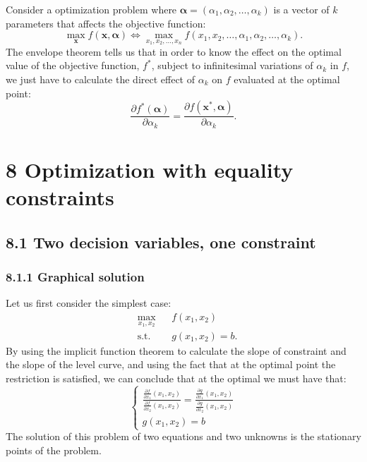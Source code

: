 \documentclass[0pt, a4paper]{article}
\begin{document}
Consider a optimization problem where $\boldsymbol{\alpha}=(\alpha_1,\alpha_2,\dots,\alpha_k)$ is a vector of $k$ parameters that affects the objective function:
$$\max_\textbf{x} f(\textbf{x},\boldsymbol{\alpha})\Leftrightarrow\max_{x_1,x_2,\dots,x_n}f(x_1,x_2,\dots,\alpha_1,\alpha_2,\dots,\alpha_k).$$
The envelope theorem tells us that in order to know the effect on the optimal value of the objective function, $f^*$, subject to infinitesimal variations of $\alpha_k$ in $f$, we just have to calculate the direct effect of $\alpha_k$ on $f$ evaluated at the optimal point:
$$\frac{\partial f^*(\boldsymbol{\alpha})}{\partial \alpha_k}=\frac{\partial f(\textbf{x}^*,\boldsymbol{\alpha})}{\partial \alpha_k}.$$

\clearpage

\section*{8 Optimization with equality constraints}
\subsection*{8.1 Two decision variables, one constraint}

\subsubsection*{8.1.1 Graphical solution}

Let us first consider the simplest case:
\begin{equation*}
	\begin{aligned}
		& \underset{x_1,x_2}{\text{max}}
		& & f(x_1,x_2) \\
		& \text{s.t.}
		& & g(x_1,x_2)=b.
	\end{aligned}
\end{equation*}
By using the implicit function theorem to calculate the slope of constraint and the slope of the level curve, and using the fact that at the optimal point the restriction is satisfied, we can conclude that at the optimal we must have that:
$$
\begin{cases}
\frac{\frac{\partial f}{\partial x_1}(x_1,x_2)}{\frac{\partial f}{\partial x_2}(x_1,x_2)}=\frac{\frac{\partial g}{\partial x_1}(x_1,x_2)}{\frac{\partial g}{\partial x_2}(x_1,x_2)}\\
g(x_1,x_2)=b
\end{cases}
$$
The solution of this problem of two equations and two unknowns is the stationary points of the problem.
\end{document}
